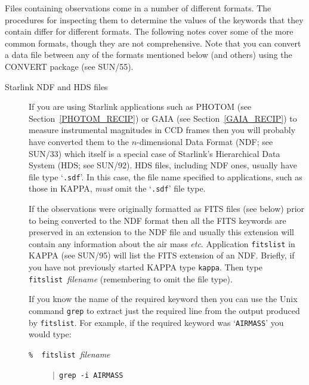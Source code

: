 \documentclass[twoside,11pt]{article}
\newcommand{\xref}[3]{#1}
\begin{document}
Files containing observations come in a number of different formats.
The procedures for inspecting them to determine the values of the
keywords that they contain differ for different formats.  The following
notes cover some of the more common formats, though they are not
comprehensive.  Note that you can convert a data file between any of
the formats mentioned below (and others) using the CONVERT package
(see \xref{SUN/55}{sun55}{}\cite{SUN55}).

\begin{description}

  \item[Starlink NDF and HDS files] If you are using Starlink
   applications such as PHOTOM (see Section~\ref{PHOTOM_RECIP}) or
   GAIA (see Section~\ref{GAIA_RECIP}) to measure instrumental
   magnitudes in CCD frames then you will probably have converted them
   to the $n$-dimensional Data Format (NDF; see
   \xref{SUN/33}{sun33}{}\cite{SUN33}) which itself is a special case
   of Starlink's Hierarchical Data System (HDS; see
   \xref{SUN/92}{sun92}{}\cite{SUN92}).  HDS files, including NDF
   ones, usually have file type `{\tt .sdf}'.  In this case, the file name
   specified to applications, such as those in KAPPA, {\it must\/} omit
   the `{\tt .sdf}' file type.

   If the observations were originally formatted as FITS files (see
   below) prior to being converted to the NDF format then all the
   FITS keywords are preserved in an extension to the NDF file and
   usually this extension will contain any information about the
   air mass \emph{etc}.  Application \xref{{\tt fitslist}}{sun95}{FITSLIST}
   in KAPPA (see \xref{SUN/95}{sun95}{}\cite{SUN95}) will list the FITS
   extension of an NDF.  Briefly, if you have not previously started
   KAPPA type {\tt kappa}.  Then type
   \xref{{\tt fitslist}}{sun95}{FITSLIST}~{\it filename}
   (remembering to omit the file type).

   If you know the name of the required keyword then you can use the
   Unix command {\tt grep} to extract just the required line from the
   output produced by {\tt fitslist}.  For example, if the required keyword
   was `{\tt AIRMASS}' you would type:

  \begin{description}

    \item[{\tt \% ~fitslist}~{\it filename\/}] {\tt $|$ grep -i AIRMASS}

  \end{description}


\end{description}
\end{document}
